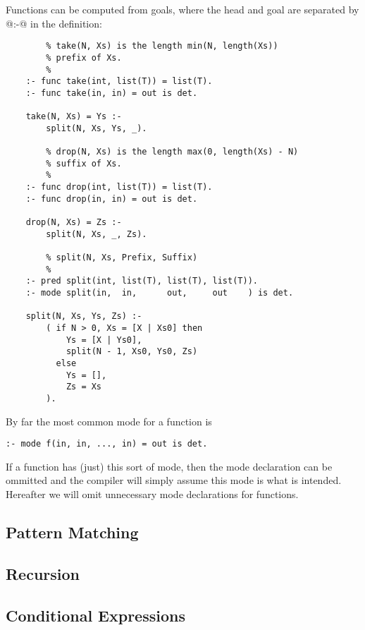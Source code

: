 Functions can be computed from goals, where the head and goal
are separated by @:-@ in the definition:
\begin{verbatim}
        % take(N, Xs) is the length min(N, length(Xs))
        % prefix of Xs.
        %
    :- func take(int, list(T)) = list(T).
    :- func take(in, in) = out is det.

    take(N, Xs) = Ys :-
        split(N, Xs, Ys, _).

        % drop(N, Xs) is the length max(0, length(Xs) - N)
        % suffix of Xs.
        %
    :- func drop(int, list(T)) = list(T).
    :- func drop(in, in) = out is det.

    drop(N, Xs) = Zs :-
        split(N, Xs, _, Zs).

        % split(N, Xs, Prefix, Suffix)
        %
    :- pred split(int, list(T), list(T), list(T)).
    :- mode split(in,  in,      out,     out    ) is det.

    split(N, Xs, Ys, Zs) :-
        ( if N > 0, Xs = [X | Xs0] then
            Ys = [X | Ys0],
            split(N - 1, Xs0, Ys0, Zs)
          else
            Ys = [],
            Zs = Xs
        ).
\end{verbatim}
By far the most common mode for a function is
\begin{verbatim}
:- mode f(in, in, ..., in) = out is det.
\end{verbatim}

If a function has (just) this sort of mode, then the mode
declaration can be ommitted and the compiler will simply assume
this mode is what is intended.  Hereafter we will omit unnecessary
mode declarations for functions.


\subsection{Pattern Matching}


\subsection{Recursion}


\subsection{Conditional Expressions}


